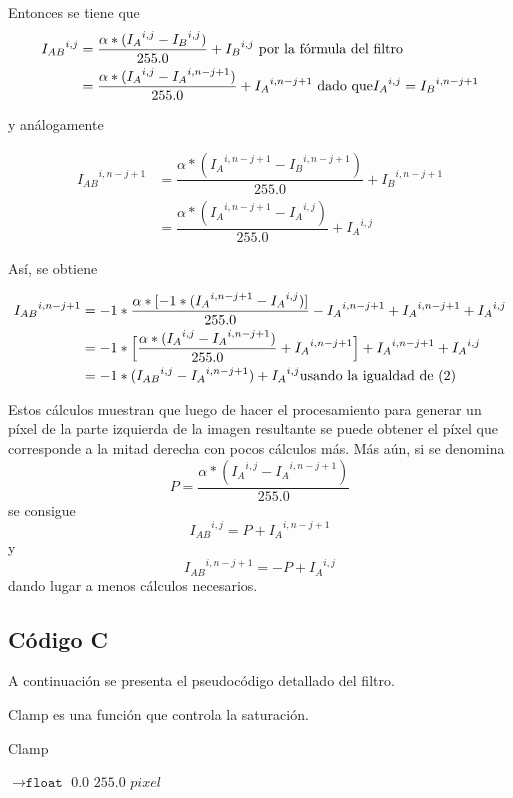 \par{Entonces se tiene que}
\begin{align}
{I_{AB}}^{i,j} &= \dfrac{\alpha * ( {I_{A}}^{i,j} - {I_{B}}^{i,j} )}{255.0} + {I_{B}}^{i,j} \textup{     por la fórmula del filtro} \nonumber \\
&= \dfrac{\alpha * ( {I_{A}}^{i,j} - {I_{A}}^{i,n - j + 1} )}{255.0} + {I_{A}}^{i,n - j + 1} \textup{    dado que} {I_{A}}^{i,j} = {I_{B}}^{i,n - j + 1}
\end{align}

y análogamente

\begin{align}
{I_{AB}}^{i,n - j + 1} &= \dfrac{\alpha * ( {I_{A}}^{i,n - j + 1} - {I_{B}}^{i,n - j +1} )}{255.0} + {I_{B}}^{i,n - j + 1}  \nonumber \\
&= \dfrac{\alpha * ( {I_{A}}^{i,n - j + 1} - {I_{A}}^{i,j} )}{255.0} + {I_{A}}^{i,j}
\end{align}

\par{Así, se obtiene}

\begin{align}
{I_{AB}}^{i,n - j + 1} &= -1 * \dfrac{\alpha * [-1 * ( {I_{A}}^{i,n - j + 1} - {I_{A}}^{i,j} )]}{255.0} - {I_{A}}^{i,n - j + 1} + {I_{A}}^{i,n - j + 1} + {I_{A}}^{i,j} \nonumber \\
&= -1 * \Big[ \dfrac{\alpha * ( {I_{A}}^{i,j} - {I_{A}}^{i,n - j + 1} )}{255.0} + {I_{A}}^{i,n - j + 1} \Big] + {I_{A}}^{i,n - j + 1} + {I_{A}}^{i,j} \nonumber \\
&= -1 * ( {I_{AB}}^{i,j} - {I_{A}}^{i,n - j + 1} ) + {I_{A}}^{i,j} \textup{usando la igualdad de (2)}
\end{align}

\par{Estos cálculos muestran que luego de hacer el procesamiento para generar un píxel de la parte izquierda de la imagen resultante se puede obtener el píxel que corresponde a la mitad derecha con pocos cálculos más. Más aún, si se denomina}
\[ P = \dfrac{\alpha * ( {I_{A}}^{i,j} - {I_{A}}^{i,n - j + 1} )}{255.0} \]
se consigue
\[ {I_{AB}}^{i,j} = P + {I_{A}}^{i,n - j + 1} \]
y
\[ {I_{AB}}^{i,n - j + 1} = -P + {I_{A}}^{i,j} \]
dando lugar a menos cálculos necesarios.

\subsection{Código C}
\par{A continuación se presenta el pseudocódigo detallado del filtro.}
\par{Clamp es una función que controla la saturación.}
\begin{algorithm}[h!]
\caption{Clamp}
\begin{algorithmic}
    $\to \texttt{float}$
		\State \Return $0.0$
	\Else
			\State \Return $255.0$
		\Else
			\State \Return $pixel$
		\EndIf
	\EndIf
\EndFunction
\end{algorithmic} 
\end{algorithm}


